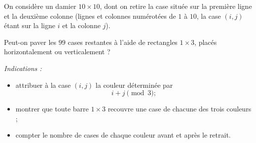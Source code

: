On considère un damier $10 \times 10$, dont on retire la case située sur la
première ligne et la deuxième colonne (lignes et colonnes numérotées de $1$ à $10$, la case
$(i, j)$ étant sur la ligne $i$ et la colonne $j$).

Peut-on paver les $99$ cases restantes à l'aide de rectangles $1 \times 3$,
placés horizontalement ou verticalement ?

\emph{Indications :}
\begin{itemize}
  \item attribuer à la case $(i, j)$ la couleur déterminée par
  \[
  i + j \pmod{3} ;
  \]
  \item montrer que toute barre $1 \times 3$ recouvre une case de chacune des
  trois couleurs ;
  \item compter le nombre de cases de chaque couleur avant et après le
  retrait.
\end{itemize}
